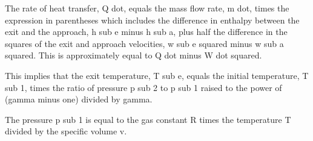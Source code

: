 The rate of heat transfer, Q dot, equals the mass flow rate, m dot, times the expression in parentheses which includes the difference in enthalpy between the exit and the approach, h sub e minus h sub a, plus half the difference in the squares of the exit and approach velocities, w sub e squared minus w sub a squared. This is approximately equal to Q dot minus W dot squared.

This implies that the exit temperature, T sub e, equals the initial temperature, T sub 1, times the ratio of pressure p sub 2 to p sub 1 raised to the power of (gamma minus one) divided by gamma.

The pressure p sub 1 is equal to the gas constant R times the temperature T divided by the specific volume v.